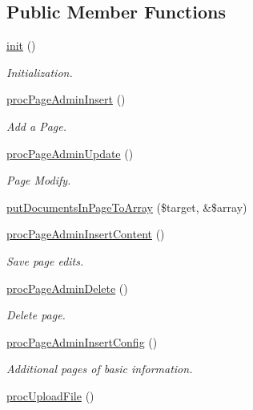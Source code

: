 \subsection*{Public Member Functions}
\begin{DoxyCompactItemize}
\item 
\hyperlink{classpageAdminController_a404c9597cbe5970e977b4d756ec3a38a}{init} ()
\begin{DoxyCompactList}\small\item\em Initialization. \end{DoxyCompactList}\item 
\hyperlink{classpageAdminController_ad93c99256e3e6c6d954205e315af9676}{proc\+Page\+Admin\+Insert} ()
\begin{DoxyCompactList}\small\item\em Add a Page. \end{DoxyCompactList}\item 
\hyperlink{classpageAdminController_a93c190dce6ce7759a509affc3f4b8167}{proc\+Page\+Admin\+Update} ()
\begin{DoxyCompactList}\small\item\em Page Modify. \end{DoxyCompactList}\item 
\hyperlink{classpageAdminController_af0ce030cf373648852d09bb95cd318fa}{put\+Documents\+In\+Page\+To\+Array} (\$target, \&\$array)
\item 
\hyperlink{classpageAdminController_a95d451eb68ffc5dd783a464d955724ac}{proc\+Page\+Admin\+Insert\+Content} ()
\begin{DoxyCompactList}\small\item\em Save page edits. \end{DoxyCompactList}\item 
\hyperlink{classpageAdminController_a11d50b1c3ffb7872eba5519cff6e9e28}{proc\+Page\+Admin\+Delete} ()
\begin{DoxyCompactList}\small\item\em Delete page. \end{DoxyCompactList}\item 
\hyperlink{classpageAdminController_a3f1f8463705b9d0daf358097e57feb2d}{proc\+Page\+Admin\+Insert\+Config} ()
\begin{DoxyCompactList}\small\item\em Additional pages of basic information. \end{DoxyCompactList}\item 
\hyperlink{classpageAdminController_a0bec7de800ea8fc74b75e71d829bffb2}{proc\+Upload\+File} ()

\end{DoxyCompactItemize}
